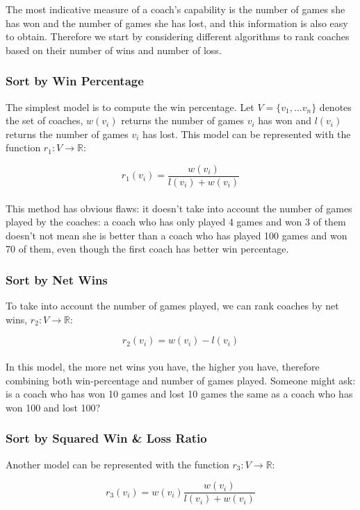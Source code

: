 \documentclass[titlepage]{article}
\begin{document}
\noindent The most indicative measure of a coach's capability is the number of games she has won and the number of games she has lost, and this information is also easy to obtain. Therefore we start by considering different algorithms to rank coaches based on their number of wins and number of loss.

\subsubsection{Sort by Win Percentage}
The simplest model is to compute the win percentage. Let $V = \{v_1, ... v_n\}$ denotes the set of coaches, $w(v_i)$ returns the number of games $v_i$ has won and $l(v_i)$ returns the number of games $v_i$ has lost. This model can be represented with the function $r_1: V \rightarrow \mathbb{R}$:

$$r_1(v_i) = \frac{w(v_i)}{l(v_i) + w(v_i)}$$
\\

\noindent This method has obvious flaws: it doesn't take into account the number of games played by the coaches: a coach who has only played 4 games and won 3 of them doesn't not mean she is better than a coach who has played 100 games and won 70 of them, even though the first coach has better win percentage.
\\


\subsubsection{Sort by Net Wins}
To take into account the number of games played, we can rank coaches by net wins, $r_2: V \rightarrow \mathbb{R}$:

$$r_2(v_i) = w(v_i) - l(v_i)$$
\\

\noindent In this model, the more net wins you have, the higher you have, therefore combining both win-percentage and number of games played. Someone might ask: is a coach who has won 10 games and lost 10 games the same as a coach who has won 100 and lost 100?

\subsubsection{Sort by Squared Win \& Loss Ratio}
Another model can be represented with the function $r_3: V \rightarrow \mathbb{R}$:

$$r_3(v_i) = w(v_i)\frac{w(v_i)}{l(v_i) + w(v_i)}$$
\\
\end{document}
